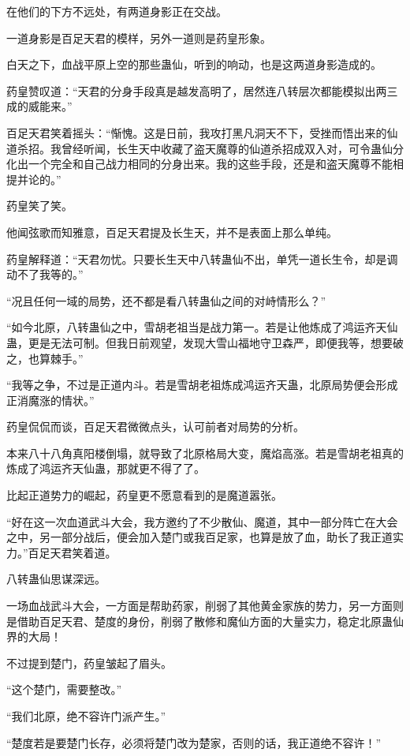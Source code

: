 \begin{this_body}
在他们的下方不远处，有两道身影正在交战。

一道身影是百足天君的模样，另外一道则是药皇形象。

白天之下，血战平原上空的那些蛊仙，听到的响动，也是这两道身影造成的。

药皇赞叹道：“天君的分身手段真是越发高明了，居然连八转层次都能模拟出两三成的威能来。”

百足天君笑着摇头：“惭愧。这是日前，我攻打黑凡洞天不下，受挫而悟出来的仙道杀招。我曾经听闻，长生天中收藏了盗天魔尊的仙道杀招成双入对，可令蛊仙分化出一个完全和自己战力相同的分身出来。我的这些手段，还是和盗天魔尊不能相提并论的。”

药皇笑了笑。

他闻弦歌而知雅意，百足天君提及长生天，并不是表面上那么单纯。

药皇解释道：“天君勿忧。只要长生天中八转蛊仙不出，单凭一道长生令，却是调动不了我等的。”

“况且任何一域的局势，还不都是看八转蛊仙之间的对峙情形么？”

“如今北原，八转蛊仙之中，雪胡老祖当是战力第一。若是让他炼成了鸿运齐天仙蛊，更是无法可制。但我日前观望，发现大雪山福地守卫森严，即便我等，想要破之，也算棘手。”

“我等之争，不过是正道内斗。若是雪胡老祖炼成鸿运齐天蛊，北原局势便会形成正消魔涨的情状。”

药皇侃侃而谈，百足天君微微点头，认可前者对局势的分析。

本来八十八角真阳楼倒塌，就导致了北原格局大变，魔焰高涨。若是雪胡老祖真的炼成了鸿运齐天仙蛊，那就更不得了了。

比起正道势力的崛起，药皇更不愿意看到的是魔道嚣张。

“好在这一次血道武斗大会，我方邀约了不少散仙、魔道，其中一部分阵亡在大会之中，另一部分战后，便会加入楚门或我百足家，也算是放了血，助长了我正道实力。”百足天君笑着道。

八转蛊仙思谋深远。

一场血战武斗大会，一方面是帮助药家，削弱了其他黄金家族的势力，另一方面则是借助百足天君、楚度的身份，削弱了散修和魔仙方面的大量实力，稳定北原蛊仙界的大局！

不过提到楚门，药皇皱起了眉头。

“这个楚门，需要整改。”

“我们北原，绝不容许门派产生。”

“楚度若是要楚门长存，必须将楚门改为楚家，否则的话，我正道绝不容许！”

\end{this_body}


